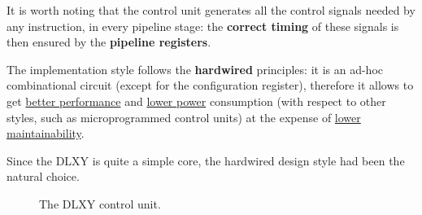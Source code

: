 It is worth noting that the control unit generates all the control signals
needed by any instruction, in every pipeline stage: the \textbf{correct timing}
of these signals is then ensured by the \textbf{pipeline registers}.

\bigskip
The implementation style follows the \textbf{hardwired} principles: it is an
ad-hoc combinational circuit (except for the configuration register), therefore
it allows to get \underline{better performance} and \underline{lower power}
consumption (with respect to other styles, such as microprogrammed control units)
at the expense of \underline{lower maintainability}.

\bigskip
Since the DLXY is quite a simple core, the hardwired design style had been the
natural choice.

\begin{figure}[H]
	\centering
	\caption{The DLXY control unit.}
	\label{fig:control_unit}
\end{figure}

